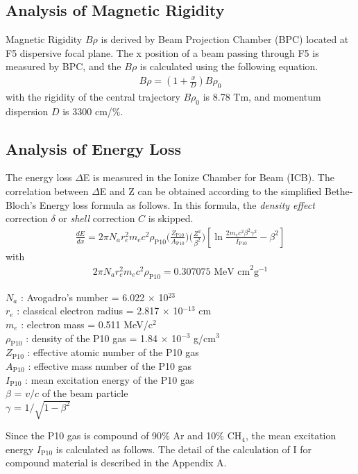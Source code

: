 \subsection{Analysis of Magnetic Rigidity}
Magnetic Rigidity $B\rho$ is derived by Beam Projection Chamber (BPC) located at F5 dispersive focal plane. The x position of a beam passing through F5 is measured by BPC, and the $B\rho$ is calculated using the following equation.
    \begin{align}
        B\rho = (1+\frac{x}{D}) B\rho_{0} 
    \end{align}
with the rigidity of the central trajectory $B\rho_{0}$ is 8.78 Tm, and  momentum dispersion $D$ is 3300 cm/$\%$. 

\subsection{Analysis of Energy Loss}
The energy loss $\Delta$E is measured in the Ionize Chamber for Beam (ICB). The correlation between $\Delta$E and Z can be obtained according to the simplified Bethe-Bloch's Energy loss formula as follows. In this formula, the \textit{density effect} correction $\delta$ or \textit{shell} correction $C$ is skipped.
    \begin{align}
        \frac{dE}{dx} = 2\pi N_{a} r_{e}^{2} m_{e} c^{2} \rho_{\text{P10}} 
        \bigg( \frac{Z_{\text{P10}}}{A_{\text{P10}}} \bigg) \bigg( \frac{Z^{2}}{\beta^{2}} \bigg) 
        \left[ \ln \frac{2m_{e}c^{2}\beta^{2}\gamma^{2}}{I_{\text{P10}}} - \beta^{2}  \right]
    \end{align}
with
    \begin{align}
        2 \pi N_{a} r_{e}^{2} m_{e} c^{2} \rho_{\text{P10}} = 0.307075 \text{ MeV cm}^{2} \text{g}^{-1} 
    \end{align}
    \begin{adjustwidth}{1cm}{}
        $N_{a}$ : Avogadro's number = 6.022 $\times$ 10$^{23}$\\
        $r_{e}$ : classical electron radius = 2.817 $\times$ 10$^{-13}$ cm\\ 
        $m_{e}$ : electron mass = 0.511 MeV/c$^{2}$\\
        $\rho_{\text{P10}}$ : density of the P10 gas = 1.84 $\times$ 10$^{-3}$ g/cm$^{3}$\\
        $Z_{\text{P10}}$ : effective atomic number of the P10 gas\\
        $A_{\text{P10}}$ : effective mass number of the P10 gas\\
        $I_{\text{P10}}$ : mean excitation energy of the P10 gas\\ 
        $\beta$ = $v / c$ of the beam particle\\
        $\gamma$ = $1 / \sqrt{1-\beta^{2}}$
    \end{adjustwidth}
\vspace{3mm}
\indent Since the P10 gas is compound of 90$\%$ Ar and 10$\%$ CH$_{4}$, the mean excitation energy $I_{\text{P10}}$ is calculated as follows. The detail of the calculation of I for compound material is described in the Appendix A.

